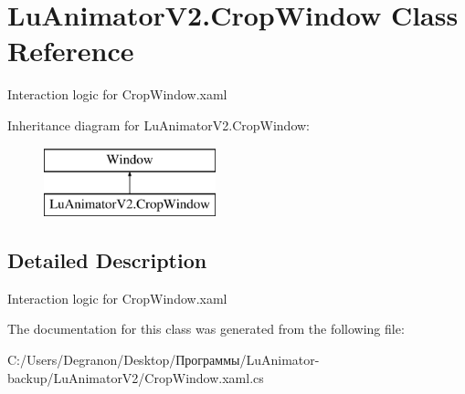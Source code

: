 \hypertarget{class_lu_animator_v2_1_1_crop_window}{}\section{Lu\+Animator\+V2.\+Crop\+Window Class Reference}
\label{class_lu_animator_v2_1_1_crop_window}


Interaction logic for Crop\+Window.\+xaml  


Inheritance diagram for Lu\+Animator\+V2.\+Crop\+Window\+:\begin{figure}[H]
\begin{center}
\leavevmode
\includegraphics[height=2.000000cm]{class_lu_animator_v2_1_1_crop_window}
\end{center}
\end{figure}


\subsection{Detailed Description}
Interaction logic for Crop\+Window.\+xaml 



The documentation for this class was generated from the following file\+:\begin{DoxyCompactItemize}
\item 
C\+:/\+Users/\+Degranon/\+Desktop/Программы/\+Lu\+Animator-\/backup/\+Lu\+Animator\+V2/Crop\+Window.\+xaml.\+cs\end{DoxyCompactItemize}
